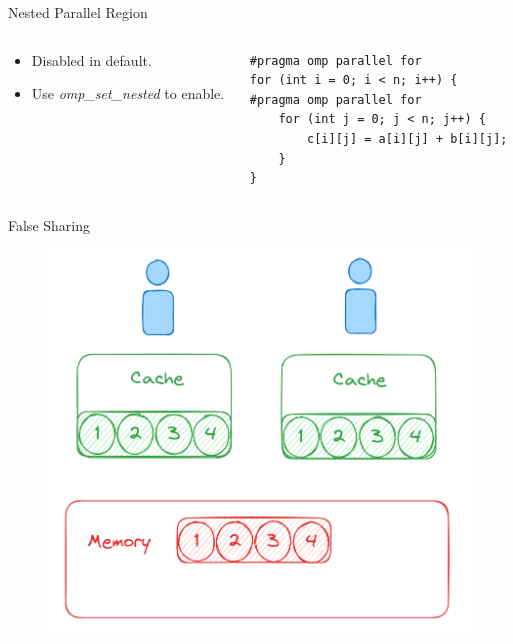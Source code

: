 \begin{frame}[fragile]{Nested Parallel Region}
    \begin{columns}[T] %
        \begin{column}{0.3\textwidth}
            \begin{itemize}
                \item Disabled in default.
                \item Use \textit{omp\_set\_nested} to enable.
            \end{itemize}
        \end{column}

        \begin{column}{0.7\textwidth}
            \begin{verbatim}
#pragma omp parallel for
for (int i = 0; i < n; i++) {
#pragma omp parallel for
    for (int j = 0; j < n; j++) {
        c[i][j] = a[i][j] + b[i][j];
    }
}
            \end{verbatim}
        \end{column}
    \end{columns}
\end{frame}

\begin{frame}{False Sharing}
    \begin{figure}
        \centering
        \includegraphics[width=0.5\linewidth]{day8_am/img/false_sharing.png}
    \end{figure}
\end{frame}

